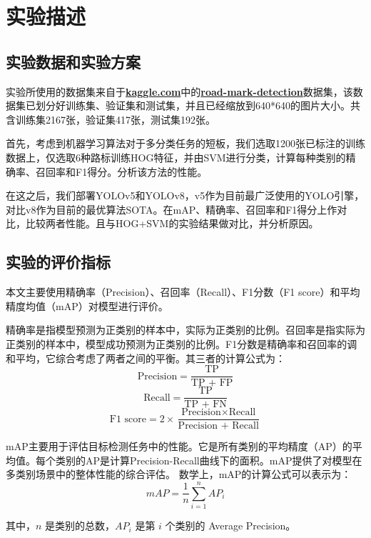 \documentclass{article}
\begin{document}
\section{实验描述}
\subsection{实验数据和实验方案}
实验所使用的数据集来自于\href{https://www.kaggle.com/}{\textbf{kaggle.com}}中的\href{https://www.kaggle.com/datasets/pkdarabi/road-mark-detection}{\textbf{road-mark-detection}}数据集，该数据集已划分好训练集、验证集和测试集，并且已经缩放到640*640的图片大小。共含训练集2167张，验证集417张，测试集192张。

首先，考虑到机器学习算法对于多分类任务的短板，我们选取1200张已标注的训练数据上，仅选取6种路标训练HOG特征，并由SVM进行分类，计算每种类别的精确率、召回率和F1得分。分析该方法的性能。

在这之后，我们部署YOLOv5和YOLOv8，v5作为目前最广泛使用的YOLO引擎，对比v8作为目前的最优算法SOTA。在mAP、精确率、召回率和F1得分上作对比，比较两者性能。且与HOG+SVM的实验结果做对比，并分析原因。

\subsection{实验的评价指标}
本文主要使用精确率（Precision）、召回率（Recall）、F1分数（F1 score）和平均精度均值（mAP）对模型进行评价。

精确率是指模型预测为正类别的样本中，实际为正类别的比例。召回率是指实际为正类别的样本中，模型成功预测为正类别的比例。F1分数是精确率和召回率的调和平均，它综合考虑了两者之间的平衡。其三者的计算公式为：
   \[ \text{Precision} = \frac{\text{TP}}{\text{TP + FP}} \]
   \[ \text{Recall} = \frac{\text{TP}}{\text{TP + FN}} \]
   \[ \text{F1 score} = 2 \times \frac{\text{Precision} \times \text{Recall}}{\text{Precision + Recall}} \]

mAP主要用于评估目标检测任务中的性能。它是所有类别的平均精度（AP）的平均值。每个类别的AP是计算Precision-Recall曲线下的面积。mAP提供了对模型在多类别场景中的整体性能的综合评估。
数学上，mAP的计算公式可以表示为：
\[ mAP = \frac{1}{n} \sum_{i=1}^{n} AP_i \]

其中，\( n \) 是类别的总数，\( AP_i \) 是第 \( i \) 个类别的 Average Precision。
\end{document}

